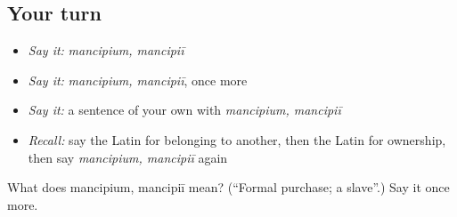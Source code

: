 \subsection*{Your turn}
\begin{itemize}
\raggedright
  \item \emph{Say it:} \emph{mancipium, mancipiī}
  \item \emph{Say it:} \emph{mancipium, mancipiī}, once more
  \item \emph{Say it:} a sentence of your own with \emph{mancipium, mancipiī}
  \item \emph{Recall:} say the Latin for belonging to another, then the Latin for ownership, then say \emph{mancipium, mancipiī} again
\end{itemize}

\begin{tcolorbox}[breakable,colback=teal!4,colframe=teal!35!black,title={Before you move on}]
What does mancipium, mancipiī mean? (\textquotedblleft{}Formal purchase; a slave\textquotedblright{}.) Say it once more.
\end{tcolorbox}
